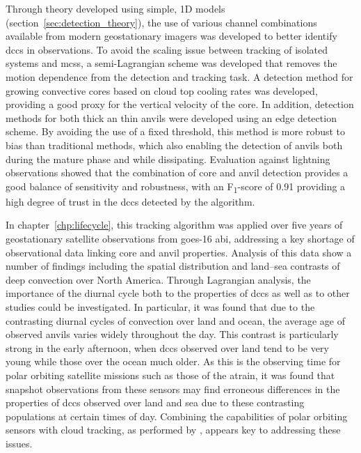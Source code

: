 Through theory developed using simple, 1D models (section~\ref{sec:detection_theory}), the use of various channel combinations available from modern geostationary imagers was developed to better identify \acrshort{dcc}s in observations.
To avoid the scaling issue between tracking of isolated systems and \acrshort{mcs}s, a semi-Lagrangian scheme was developed that removes the motion dependence from the detection and tracking task.
A detection method for growing convective cores based on cloud top cooling rates was developed, providing a good proxy for the vertical velocity of the core.
In addition, detection methods for both thick an thin anvils were developed using an edge detection scheme.
By avoiding the use of a fixed threshold, this method is more robust to bias than traditional methods, which also enabling the detection of anvils both during the mature phase and while dissipating.
Evaluation against lightning observations showed that the combination of core and anvil detection provides a good balance of sensitivity and robustness,  with an F\textsubscript{1}-score of 0.91 providing a high degree of trust in the \acrshort{dcc}s detected by the algorithm.

In chapter~\ref{chp:lifecycle}, this tracking algorithm was applied over five years of geostationary satellite observations from \acrshort{goes}-16 \acrshort{abi}, addressing a key shortage of observational data linking core and anvil properties.
Analysis of this data show a number of findings including the spatial distribution and land--sea contrasts of deep convection over North America.
Through Lagrangian analysis, the importance of the diurnal cycle both to the properties of \acrshort{dcc}s as well as to other studies could be investigated.
In particular, it was found that due to the contrasting diurnal cycles of convection over land and ocean, the average age of observed anvils varies widely throughout the day.
This contrast is particularly strong in the early afternoon, when \acrshort{dcc}s observed over land tend to be very young while those over the ocean much older.
As this is the observing time for polar orbiting satellite missions such as those of the \acrshort{atrain}, it was found that snapshot observations from these sensors may find erroneous differences in the properties of \acrshort{dcc}s observed over land and sea due to these contrasting populations at certain times of day.
Combining the capabilities of polar orbiting sensors with cloud tracking, as performed by \citet{elsaesser_simple_2022}, appears key to addressing these issues.

